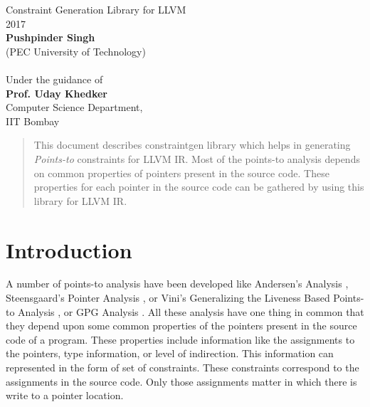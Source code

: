 \documentclass[a4paper,12pt]{report}
\begin{document}
 
\begin{titlepage}
\begin{center}
    \vspace*{\fill}
    \huge{Constraint Generation Library for LLVM}\\
    \vspace{2cm}
    \large{2017}\\


    \vspace{2cm}
    \textbf{Pushpinder Singh}\\
    (PEC University of Technology)\\

    ~\\
    Under the guidance of\\
    \textbf{Prof. Uday Khedker}\\
    Computer Science Department,\\
    IIT Bombay

    \vspace*{\fill}
\end{center}
\end{titlepage}


\begin{abstract}

This document describes constraintgen library which helps in generating \textit{Points-to}
constraints for LLVM IR. Most of the points-to analysis depends on common
properties of pointers present in the source code. These properties for
each pointer in the source code can be gathered by using this library for
LLVM IR.

\end{abstract}

\tableofcontents

\chapter{Introduction}

A number of points-to analysis have been developed like Andersen's Analysis
\cite{Andersons}, Steensgaard's Pointer Analysis \cite{Steensgaard}, or Vini's
Generalizing the Liveness Based Points-to Analysis \cite{Vini:2014}, or GPG Analysis \cite{Pritams}. All these
analysis have one thing in common that they depend upon some common properties of
the pointers  present in the source code of a program. These properties include
information like the assignments to the pointers, type information, or level
of indirection. This information can represented in the form of set of constraints.
These constraints correspond to the assignments in the source code. Only those 
assignments matter in which there is write to a pointer location.
\end{document}
